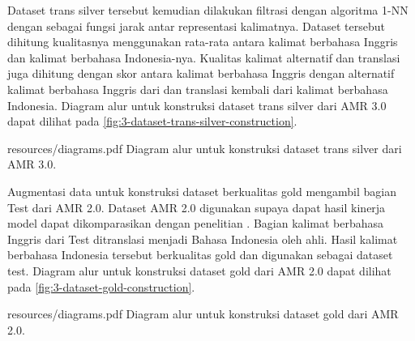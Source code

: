Dataset trans silver tersebut kemudian dilakukan filtrasi dengan algoritma 1-NN dengan \cossim{} sebagai fungsi jarak antar representasi kalimatnya.
Dataset tersebut dihitung kualitasnya menggunakan rata-rata \cossim{} antara kalimat berbahasa Inggris dan kalimat berbahasa Indonesia-nya.
Kualitas kalimat alternatif dan translasi juga dihitung dengan skor \BLEU{} antara kalimat berbahasa Inggris dengan alternatif kalimat berbahasa Inggris dari \AMRtoTEXT{} dan translasi kembali dari kalimat berbahasa Indonesia.
Diagram alur untuk konstruksi dataset trans silver dari AMR 3.0 dapat dilihat pada \cref{fig:3-dataset-trans-silver-construction}.

  {resources/diagrams.pdf}
  {Diagram alur untuk konstruksi dataset trans silver dari AMR 3.0.}

Augmentasi data untuk konstruksi dataset berkualitas gold mengambil bagian Test  dari AMR 2.0.
Dataset AMR 2.0 digunakan supaya dapat hasil kinerja model dapat dikomparasikan dengan penelitian \textcite{putra2022}.
Bagian kalimat berbahasa Inggris dari Test  ditranslasi menjadi Bahasa Indonesia oleh ahli.
Hasil kalimat berbahasa Indonesia tersebut berkualitas gold dan digunakan sebagai dataset test.
Diagram alur untuk konstruksi dataset gold dari AMR 2.0 dapat dilihat pada \cref{fig:3-dataset-gold-construction}.

  {resources/diagrams.pdf}
  {Diagram alur untuk konstruksi dataset gold dari AMR 2.0.}

\newcommand\graphMasked{\codesm{\textcolor[rgb]{0,.33,0}{<g>$g_1$,..[mask]..,$g_m$</g>}}}
\newcommand\graphBarMasked{\codesm{\textcolor[rgb]{0,.33,0}{<g>[mask]</g>}}}
\newcommand\idTagged[1]{\codesm{\textcolor{purple}{<id>#1</id>}}}
\newcommand\enTagged[1]{\codesm{\textcolor{blue}{<en>#1</en>}}}
\newcommand\sTagged[1]{\codesm{\textcolor{purple}{<s>#1</s>}}}

